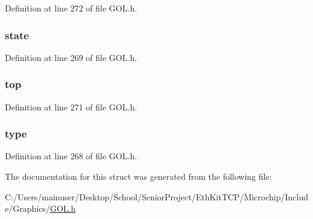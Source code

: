Definition at line 272 of file G\+O\+L.\+h.

\hypertarget{struct_o_b_j___h_e_a_d_e_r_a5d717a64978f34c9afb8ae23374160a0}{}
\subsubsection[{state}]{ state}\label{struct_o_b_j___h_e_a_d_e_r_a5d717a64978f34c9afb8ae23374160a0}


Definition at line 269 of file G\+O\+L.\+h.

\hypertarget{struct_o_b_j___h_e_a_d_e_r_ae53b6204fda5d3270bd1a3aba7a88eab}{}
\subsubsection[{top}]{ top}\label{struct_o_b_j___h_e_a_d_e_r_ae53b6204fda5d3270bd1a3aba7a88eab}


Definition at line 271 of file G\+O\+L.\+h.

\hypertarget{struct_o_b_j___h_e_a_d_e_r_a0c6d83fa135e978036a424ac749b32d9}{}
\subsubsection[{type}]{ type}\label{struct_o_b_j___h_e_a_d_e_r_a0c6d83fa135e978036a424ac749b32d9}


Definition at line 268 of file G\+O\+L.\+h.



The documentation for this struct was generated from the following file\+:\begin{DoxyCompactItemize}
\item 
C\+:/\+Users/mainuser/\+Desktop/\+School/\+Senior\+Project/\+Eth\+Kit\+T\+C\+P/\+Microchip/\+Include/\+Graphics/\hyperlink{_g_o_l_8h}{G\+O\+L.\+h}\end{DoxyCompactItemize}
